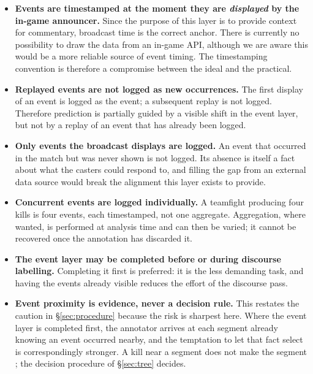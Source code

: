 \begin{itemize}
  \item {} \textbf{Events are timestamped at the moment they are \emph{displayed} by the in-game announcer.} Since the purpose of this layer is to provide context for commentary, broadcast time is the correct anchor. There is currently no possibility to draw the data from an in-game API, although we are aware this would be a more reliable source of event timing. The timestamping convention is therefore a compromise between the ideal and the practical.
  
  \item {} \textbf{Replayed events are not logged as new occurrences.} The first display of an event is logged as the event; a subsequent replay is not logged. Therefore \REC{} prediction is partially guided by a visible shift in the event layer, but not by a replay of an event that has already been logged.

  \item {} \textbf{Only events the broadcast displays are logged.} An event that occurred in the match but was never shown is not logged. Its absence is itself a fact about what the casters could respond to, and filling the gap from an external data source would break the alignment this layer exists to provide.

  \item {} \textbf{Concurrent events are logged individually.} A teamfight producing four kills is four events, each timestamped, not one aggregate. Aggregation, where wanted, is performed at analysis time and can then be varied; it cannot be recovered once the annotation has discarded it.

  \item {} \textbf{The event layer may be completed before or during discourse labelling.} Completing it first is preferred: it is the less demanding task, and having the events already visible reduces the effort of the discourse pass.

  \item {} \textbf{Event proximity is evidence, never a decision rule.} This restates the caution in \S\ref{sec:procedure} because the risk is sharpest here. Where the event layer is completed first, the annotator arrives at each segment already knowing an event occurred nearby, and the temptation to let that fact select \PBP{} is correspondingly stronger. A kill near a segment does not make the segment \PBP{}; the decision procedure of \S\ref{sec:tree} decides.
\end{itemize}

